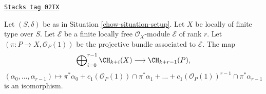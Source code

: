 \begin{lemma}

\label{chow-lemma-chow-ring-projective-bundle}
\href{https://stacks.math.columbia.edu/tag/02TX}{\texttt{Stacks tag 02TX}}

Let $(S, \delta)$ be as in Situation \ref{chow-situation-setup}.
Let $X$ be locally of finite type over $S$.
Let $\mathcal{E}$ be a finite locally free $\mathcal{O}_X$-module
$\mathcal{E}$ of rank $r$. Let $(\pi : P \to X, \mathcal{O}_P(1))$
be the projective bundle associated to $\mathcal{E}$.
The map
$$
\bigoplus\nolimits_{i = 0}^{r - 1}
\CH_{k + i}(X)
\longrightarrow
\CH_{k + r - 1}(P),
$$
$$
(\alpha_0, \ldots, \alpha_{r-1})
\longmapsto
\pi^*\alpha_0 +
c_1(\mathcal{O}_P(1)) \cap \pi^*\alpha_1
+ \ldots +
c_1(\mathcal{O}_P(1))^{r - 1} \cap \pi^*\alpha_{r-1}
$$
is an isomorphism.
\end{lemma}

